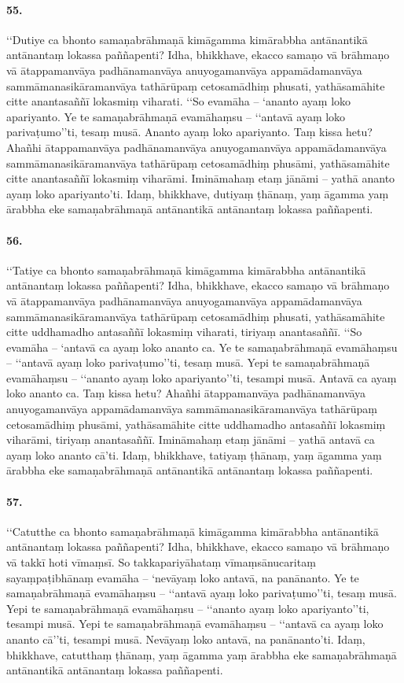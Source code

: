 \paragraph{55.}
‘‘Dutiye ca bhonto samaṇabrāhmaṇā kimāgamma kimārabbha antānantikā antānantaṃ lokassa paññapenti? Idha, bhikkhave, ekacco samaṇo vā brāhmaṇo vā ātappamanvāya padhānamanvāya anuyogamanvāya appamādamanvāya sammāmanasikāramanvāya tathārūpaṃ cetosamādhiṃ phusati, yathāsamāhite citte anantasaññī lokasmiṃ viharati. ‘‘So evamāha – ‘ananto ayaṃ loko apariyanto. Ye te samaṇabrāhmaṇā evamāhaṃsu – ‘‘antavā ayaṃ loko parivaṭumo’’ti, tesaṃ musā. Ananto ayaṃ loko apariyanto. Taṃ kissa hetu? Ahañhi ātappamanvāya padhānamanvāya anuyogamanvāya appamādamanvāya sammāmanasikāramanvāya tathārūpaṃ cetosamādhiṃ phusāmi, yathāsamāhite citte anantasaññī lokasmiṃ viharāmi. Imināmahaṃ etaṃ jānāmi – yathā ananto ayaṃ loko apariyanto’ti. Idaṃ, bhikkhave, dutiyaṃ ṭhānaṃ, yaṃ āgamma yaṃ ārabbha eke samaṇabrāhmaṇā antānantikā antānantaṃ lokassa paññapenti.

\paragraph{56.}
‘‘Tatiye ca bhonto samaṇabrāhmaṇā kimāgamma kimārabbha antānantikā antānantaṃ lokassa paññapenti? Idha, bhikkhave, ekacco samaṇo vā brāhmaṇo vā ātappamanvāya padhānamanvāya anuyogamanvāya appamādamanvāya sammāmanasikāramanvāya tathārūpaṃ cetosamādhiṃ phusati, yathāsamāhite citte uddhamadho antasaññī lokasmiṃ viharati, tiriyaṃ anantasaññī. ‘‘So evamāha – ‘antavā ca ayaṃ loko ananto ca. Ye te samaṇabrāhmaṇā evamāhaṃsu – ‘‘antavā ayaṃ loko parivaṭumo’’ti, tesaṃ musā. Yepi te samaṇabrāhmaṇā evamāhaṃsu – ‘‘ananto ayaṃ loko apariyanto’’ti, tesampi musā. Antavā ca ayaṃ loko ananto ca. Taṃ kissa hetu? Ahañhi ātappamanvāya padhānamanvāya anuyogamanvāya appamādamanvāya sammāmanasikāramanvāya tathārūpaṃ cetosamādhiṃ phusāmi, yathāsamāhite citte uddhamadho antasaññī lokasmiṃ viharāmi, tiriyaṃ anantasaññī. Imināmahaṃ etaṃ jānāmi – yathā antavā ca ayaṃ loko ananto cā’ti. Idaṃ, bhikkhave, tatiyaṃ ṭhānaṃ, yaṃ āgamma yaṃ ārabbha eke samaṇabrāhmaṇā antānantikā antānantaṃ lokassa paññapenti.

\paragraph{57.}
‘‘Catutthe ca bhonto samaṇabrāhmaṇā kimāgamma kimārabbha antānantikā antānantaṃ lokassa paññapenti? Idha, bhikkhave, ekacco samaṇo vā brāhmaṇo vā takkī hoti vīmaṃsī. So takkapariyāhataṃ vīmaṃsānucaritaṃ sayaṃpaṭibhānaṃ evamāha – ‘nevāyaṃ loko antavā, na panānanto. Ye te samaṇabrāhmaṇā evamāhaṃsu – ‘‘antavā ayaṃ loko parivaṭumo’’ti, tesaṃ musā. Yepi te samaṇabrāhmaṇā evamāhaṃsu – ‘‘ananto ayaṃ loko apariyanto’’ti, tesampi musā. Yepi te samaṇabrāhmaṇā evamāhaṃsu – ‘‘antavā ca ayaṃ loko ananto cā’’ti, tesampi musā. Nevāyaṃ loko antavā, na panānanto’ti. Idaṃ, bhikkhave, catutthaṃ ṭhānaṃ, yaṃ āgamma yaṃ ārabbha eke samaṇabrāhmaṇā antānantikā antānantaṃ lokassa paññapenti.

